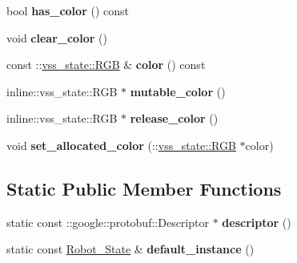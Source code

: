 \begin{DoxyCompactItemize}
\item 
bool {\bfseries has\+\_\+color} () const \hypertarget{classvss__state_1_1Robot__State_a319868975523f46fce84fedda26c478e}{}\label{classvss__state_1_1Robot__State_a319868975523f46fce84fedda26c478e}

\item 
void {\bfseries clear\+\_\+color} ()\hypertarget{classvss__state_1_1Robot__State_a0d95199c67056fd8a0b6bb873d278392}{}\label{classvss__state_1_1Robot__State_a0d95199c67056fd8a0b6bb873d278392}

\item 
const \+::\hyperlink{classvss__state_1_1RGB}{vss\+\_\+state\+::\+R\+GB} \& {\bfseries color} () const \hypertarget{classvss__state_1_1Robot__State_a1e8b02c137ceae1f7a875bdf5371aa91}{}\label{classvss__state_1_1Robot__State_a1e8b02c137ceae1f7a875bdf5371aa91}

\item 
inline\+::vss\+\_\+state\+::\+R\+GB $\ast$ {\bfseries mutable\+\_\+color} ()\hypertarget{classvss__state_1_1Robot__State_aa91b85fa199de6f9b4673529f86f1d01}{}\label{classvss__state_1_1Robot__State_aa91b85fa199de6f9b4673529f86f1d01}

\item 
inline\+::vss\+\_\+state\+::\+R\+GB $\ast$ {\bfseries release\+\_\+color} ()\hypertarget{classvss__state_1_1Robot__State_aba8a8ff5aa02a978e3ff2e8b6335f0ce}{}\label{classvss__state_1_1Robot__State_aba8a8ff5aa02a978e3ff2e8b6335f0ce}

\item 
void {\bfseries set\+\_\+allocated\+\_\+color} (\+::\hyperlink{classvss__state_1_1RGB}{vss\+\_\+state\+::\+R\+GB} $\ast$color)\hypertarget{classvss__state_1_1Robot__State_a368a1f90ce946cd075aa050885e1e6d3}{}\label{classvss__state_1_1Robot__State_a368a1f90ce946cd075aa050885e1e6d3}

\end{DoxyCompactItemize}
\subsection*{Static Public Member Functions}
\begin{DoxyCompactItemize}
\item 
static const \+::google\+::protobuf\+::\+Descriptor $\ast$ {\bfseries descriptor} ()\hypertarget{classvss__state_1_1Robot__State_af15c0b33b2edbd683bfb87c76e9b94b7}{}\label{classvss__state_1_1Robot__State_af15c0b33b2edbd683bfb87c76e9b94b7}

\item 
static const \hyperlink{classvss__state_1_1Robot__State}{Robot\+\_\+\+State} \& {\bfseries default\+\_\+instance} ()\hypertarget{classvss__state_1_1Robot__State_aa14ffa0e9a4e47e1c824b2c82039b02c}{}\label{classvss__state_1_1Robot__State_aa14ffa0e9a4e47e1c824b2c82039b02c}

\end{DoxyCompactItemize}
